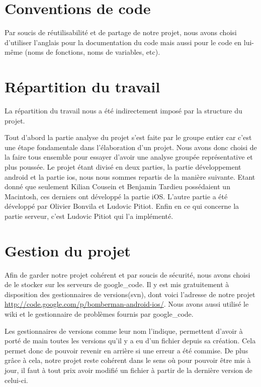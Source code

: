 \section{Conventions de code}
	Par soucis de réutilisabilité et de partage de notre projet, 
	nous avons choisi d'utiliser l'anglais pour la documentation du code mais aussi 
	pour le code en lui-même (noms de fonctions, noms de variables, etc).


\section{Répartition du travail}
	La répartition du travail nous a été indirectement imposé par la structure du projet. 
	
	Tout d'abord la partie analyse du projet s'est faite par le groupe entier car
	c'est une étape fondamentale dans l'élaboration d'un projet. Nous avons donc choisi de
	la faire tous ensemble pour essayer d'avoir une analyse groupée représentative
	et plus poussée. 
	Le projet étant divisé en deux parties, la partie développement \gls{android}
	et la partie \gls{ios}, nous nous sommes repartis de la manière suivante.
	Etant donné que seulement Kilian Cousein et Benjamin Tardieu possédaient un
	Macintosh, ces derniers ont développé la partie iOS. L'autre partie a été
	développé par Olivier Bonvila et Ludovic Pitiot. 
	Enfin en ce qui concerne la partie serveur, c'est Ludovic Pitiot qui l'a implémenté.
	
	
\section{Gestion du projet}
	Afin de garder notre projet cohérent et par soucis de sécurité, nous avons
	choisi de le stocker sur les serveurs de \gls{google_code}. Il y est mis
	gratuitement à disposition des gestionnaires de versions(\gls{svn}), dont voici
	l'adresse de notre projet \url{http://code.google.com/p/bomberman-android-ios/}. 
	Nous avons aussi utilisé le wiki et le gestionnaire de problèmes fournis par
	\gls{google_code}.
	
	Les gestionnaires de versions comme leur nom l'indique, permettent d'avoir à
	porté de main toutes les versions qu'il y a eu d'un fichier depuis sa
	création. Cela permet donc de pouvoir revenir en arrière si une erreur a été
	commise. De plus grâce à cela, notre projet reste cohérent dans le sens où
	pour pouvoir être mis à jour, il faut à tout prix avoir modifié un fichier à
	partir de la dernière version de celui-ci.
		

